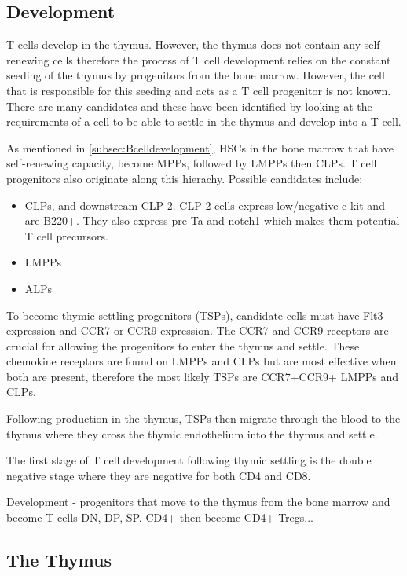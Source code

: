 \subsection{Development}

T cells develop in the thymus.
However, the thymus does not contain any self-renewing cells therefore the process of T cell development relies on the constant seeding of the thymus by progenitors from the bone marrow.
However, the cell that is responsible for this seeding and acts as a T cell progenitor is not known.
There are many candidates and these have been identified by looking at the requirements of a cell to be able to settle in the thymus and develop into a T cell.

As mentioned in \cref{subsec:Bcelldevelopment}, HSCs in the bone marrow that have self-renewing capacity, become MPPs, followed by LMPPs then CLPs.
T cell progenitors also originate along this hierachy.
Possible candidates include:
\begin{itemize}
\item CLPs, and downstream CLP-2. 
CLP-2 cells express low/negative c-kit and are B220+.
They also express pre-Ta and notch1 which makes them potential T cell precursors.
\item LMPPs 
\item ALPs
\end{itemize}

To become thymic settling progenitors (TSPs), candidate cells must have Flt3 expression and CCR7 or CCR9 expression.
The CCR7 and CCR9 receptors are crucial for allowing the progenitors to enter the thymus and settle. 
These chemokine receptors are found on LMPPs and CLPs but are most effective when both are present, therefore the most likely TSPs are CCR7+CCR9+ LMPPs and CLPs.

Following production in the thymus, TSPs then migrate through the blood to the thymus where they cross the thymic endothelium into the thymus and settle.

The first stage of T cell development following thymic settling is the double negative stage where they are negative for both CD4 and CD8.


Development - progenitors that move to the thymus from the bone marrow and become T cells
DN, DP, SP.
CD4+ then become CD4+ Tregs...

\subsection{The Thymus}
